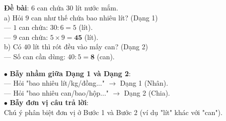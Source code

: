 \documentclass[14pt,a4paper,oneside]{extbook}
\begin{document}
\noindent
\begin{minipage}[t]{0.53\textwidth}
  \begin{tcolorbox}[
    enhanced,
    title={\footnotesize\bfseries\color{white}\faCheckCircle\ Ví dụ thực hành chuẩn mực},
    colback=green!2!white,
    colframe=green!60!black,
    arc=2.5mm, boxrule=0.8pt, top=1.8mm, bottom=1.8mm, left=2.2mm, right=2.2mm
  ]
    \footnotesize
    \textbf{Đề bài}: $6$ can chứa $30$ lít nước mắm.\\
    a) Hỏi $9$ can như thế chứa bao nhiêu lít? (Dạng 1)\\
    --- $1$ can chứa: $30 : 6 = 5$ (lít).\\
    --- $9$ can chứa: $5 \times 9 = \mathbf{45}$ (lít).\\[1mm]
    b) Có $40$ lít thì rót đều vào mấy can? (Dạng 2)\\
    --- Số can cần dùng: $40 : 5 = \mathbf{8}$ (can).
  \end{tcolorbox}
\end{minipage}%
\hfill
\begin{minipage}[t]{0.45\textwidth}
  \begin{tcolorbox}[
    enhanced,
    title={\footnotesize\bfseries\color{white}\faExclamationTriangle\ Mẹo tránh bẫy trắc nghiệm},
    colback=red!2!white,
    colframe=red!70!black,
    arc=2.5mm, boxrule=0.8pt, top=1.8mm, bottom=1.8mm, left=2.2mm, right=2.2mm
  ]
    \footnotesize
    $\bullet$ \textbf{Bẫy nhầm giữa Dạng 1 và Dạng 2}:\\
    --- Hỏi "bao nhiêu lít/kg/đồng..." $\rightarrow$ Dạng 1 (Nhân).\\
    --- Hỏi "bao nhiêu can/bao/hộp..." $\rightarrow$ Dạng 2 (Chia).\\
    $\bullet$ \textbf{Bẫy đơn vị câu trả lời}:\\
    Chú ý phân biệt đơn vị ở Bước 1 và Bước 2 (ví dụ "lít" khác với "can").
  \end{tcolorbox}
\end{minipage}
\end{document}
